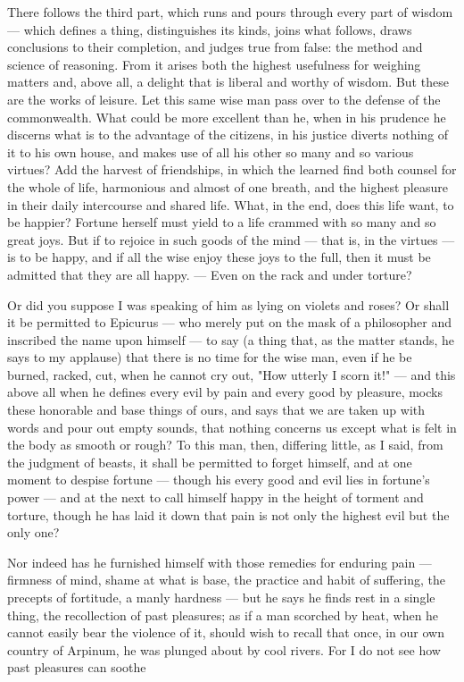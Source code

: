  There follows the third part, which runs and pours through every part of wisdom — which defines a thing, distinguishes its kinds, joins what follows, draws conclusions to their completion, and judges true from false: the method and science of reasoning. From it arises both the highest usefulness for weighing matters and, above all, a delight that is liberal and worthy of wisdom. But these are the works of leisure. Let this same wise man pass over to the defense of the commonwealth. What could be more excellent than he, when in his prudence he discerns what is to the advantage of the citizens, in his justice diverts nothing of it to his own house, and makes use of all his other so many and so various virtues? Add the harvest of friendships, in which the learned find both counsel for the whole of life, harmonious and almost of one breath, and the highest pleasure in their daily intercourse and shared life. What, in the end, does this life want, to be happier? Fortune herself must yield to a life crammed with so many and so great joys. But if to rejoice in such goods of the mind — that is, in the virtues — is to be happy, and if all the wise enjoy these joys to the full, then it must be admitted that they are all happy. — Even on the rack and under torture?

 Or did you suppose I was speaking of him as lying on violets and roses? Or shall it be permitted to Epicurus — who merely put on the mask of a philosopher and inscribed the name upon himself — to say (a thing that, as the matter stands, he says to my applause) that there is no time for the wise man, even if he be burned, racked, cut, when he cannot cry out, "How utterly I scorn it!" — and this above all when he defines every evil by pain and every good by pleasure, mocks these honorable and base things of ours, and says that we are taken up with words and pour out empty sounds, that nothing concerns us except what is felt in the body as smooth or rough? To this man, then, differing little, as I said, from the judgment of beasts, it shall be permitted to forget himself, and at one moment to despise fortune — though his every good and evil lies in fortune's power — and at the next to call himself happy in the height of torment and torture, though he has laid it down that pain is not only the highest evil but the only one?

 Nor indeed has he furnished himself with those remedies for enduring pain — firmness of mind, shame at what is base, the practice and habit of suffering, the precepts of fortitude, a manly hardness — but he says he finds rest in a single thing, the recollection of past pleasures; as if a man scorched by heat, when he cannot easily bear the violence of it, should wish to recall that once, in our own country of Arpinum, he was plunged about by cool rivers. For I do not see how past pleasures can soothe

